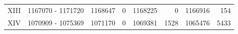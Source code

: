 \begin{table}[ht!]
\begin{center}
\begin{tabular}{c | c  r  r  r  r r r}
XIII & \num[group-separator={\,}]{1167070} - \num[group-separator={\,}]{1171720} & \num[group-separator={\,}]{1168647} & \small{\num[group-separator={\,}]{0}}  & \num[group-separator={\,}]{1168225} & \small{\num[group-separator={\,}]{0}}  & \num[group-separator={\,}]{1166916} & \small{\num[group-separator={\,}]{154}}  \\
XIV & \num[group-separator={\,}]{1070909} - \num[group-separator={\,}]{1075369} & \num[group-separator={\,}]{1071170} & \small{\num[group-separator={\,}]{0}}  & \num[group-separator={\,}]{1069381} & \small{\num[group-separator={\,}]{1528}}  & \num[group-separator={\,}]{1065476} & \small{\num[group-separator={\,}]{5433}}  \\
\end{tabular}
\end{center}
\label{supptable:trophs_results}
\end{table}


